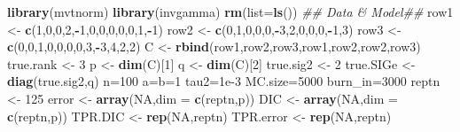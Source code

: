 \documentclass[]{book}
\newenvironment{Shaded}{\begin{snugshade}}{\end{snugshade}}
\newcommand{\CommentTok}[1]{\textcolor[rgb]{0.56,0.35,0.01}{\textit{#1}}}
\newcommand{\DataTypeTok}[1]{\textcolor[rgb]{0.13,0.29,0.53}{#1}}
\newcommand{\DecValTok}[1]{\textcolor[rgb]{0.00,0.00,0.81}{#1}}
\newcommand{\FloatTok}[1]{\textcolor[rgb]{0.00,0.00,0.81}{#1}}
\newcommand{\KeywordTok}[1]{\textcolor[rgb]{0.13,0.29,0.53}{\textbf{#1}}}
\newcommand{\NormalTok}[1]{#1}
\newcommand{\OperatorTok}[1]{\textcolor[rgb]{0.81,0.36,0.00}{\textbf{#1}}}
\newcommand{\OtherTok}[1]{\textcolor[rgb]{0.56,0.35,0.01}{#1}}
\newcommand{\StringTok}[1]{\textcolor[rgb]{0.31,0.60,0.02}{#1}}
\begin{document}
\begin{Shaded}
\begin{Highlighting}[]
\KeywordTok{library}\NormalTok{(mvtnorm)}
\KeywordTok{library}\NormalTok{(invgamma)}
\KeywordTok{rm}\NormalTok{(}\DataTypeTok{list=}\KeywordTok{ls}\NormalTok{())}
\CommentTok{## Data & Model##}
\NormalTok{row1 <-}\StringTok{ }\KeywordTok{c}\NormalTok{(}\DecValTok{1}\NormalTok{,}\DecValTok{0}\NormalTok{,}\DecValTok{0}\NormalTok{,}\DecValTok{2}\NormalTok{,}\OperatorTok{-}\DecValTok{1}\NormalTok{,}\DecValTok{0}\NormalTok{,}\DecValTok{0}\NormalTok{,}\DecValTok{0}\NormalTok{,}\DecValTok{0}\NormalTok{,}\DecValTok{0}\NormalTok{,}\DecValTok{1}\NormalTok{,}\OperatorTok{-}\DecValTok{1}\NormalTok{)}
\NormalTok{row2 <-}\StringTok{ }\KeywordTok{c}\NormalTok{(}\DecValTok{0}\NormalTok{,}\DecValTok{1}\NormalTok{,}\DecValTok{0}\NormalTok{,}\DecValTok{0}\NormalTok{,}\DecValTok{0}\NormalTok{,}\OperatorTok{-}\DecValTok{3}\NormalTok{,}\DecValTok{2}\NormalTok{,}\DecValTok{0}\NormalTok{,}\DecValTok{0}\NormalTok{,}\DecValTok{0}\NormalTok{,}\OperatorTok{-}\DecValTok{1}\NormalTok{,}\DecValTok{3}\NormalTok{)}
\NormalTok{row3 <-}\StringTok{ }\KeywordTok{c}\NormalTok{(}\DecValTok{0}\NormalTok{,}\DecValTok{0}\NormalTok{,}\DecValTok{1}\NormalTok{,}\DecValTok{0}\NormalTok{,}\DecValTok{0}\NormalTok{,}\DecValTok{0}\NormalTok{,}\DecValTok{0}\NormalTok{,}\DecValTok{3}\NormalTok{,}\OperatorTok{-}\DecValTok{3}\NormalTok{,}\DecValTok{4}\NormalTok{,}\DecValTok{2}\NormalTok{,}\DecValTok{2}\NormalTok{)}
\NormalTok{C <-}\StringTok{ }\KeywordTok{rbind}\NormalTok{(row1,row2,row3,row1,row2,row2,row3)}
\NormalTok{true.rank <-}\StringTok{ }\DecValTok{3}
\NormalTok{p <-}\StringTok{ }\KeywordTok{dim}\NormalTok{(C)[}\DecValTok{1}\NormalTok{]}
\NormalTok{q <-}\StringTok{ }\KeywordTok{dim}\NormalTok{(C)[}\DecValTok{2}\NormalTok{]}
\NormalTok{true.sig2 <-}\StringTok{ }\DecValTok{2}
\NormalTok{true.SIGe <-}\StringTok{ }\KeywordTok{diag}\NormalTok{(true.sig2,q)}
\NormalTok{n=}\DecValTok{100}
\NormalTok{a=b=}\DecValTok{1}
\NormalTok{tau2=}\FloatTok{1e-3}
\NormalTok{MC.size=}\DecValTok{5000}
\NormalTok{burn_in=}\DecValTok{3000}
\NormalTok{reptn <-}\StringTok{ }\DecValTok{125}
\NormalTok{error <-}\StringTok{ }\KeywordTok{array}\NormalTok{(}\OtherTok{NA}\NormalTok{,}\DataTypeTok{dim =} \KeywordTok{c}\NormalTok{(reptn,p))}
\NormalTok{DIC <-}\StringTok{ }\KeywordTok{array}\NormalTok{(}\OtherTok{NA}\NormalTok{,}\DataTypeTok{dim =} \KeywordTok{c}\NormalTok{(reptn,p))}
\NormalTok{TPR.DIC <-}\StringTok{ }\KeywordTok{rep}\NormalTok{(}\OtherTok{NA}\NormalTok{,reptn)}
\NormalTok{TPR.error <-}\StringTok{ }\KeywordTok{rep}\NormalTok{(}\OtherTok{NA}\NormalTok{,reptn)}

\end{Highlighting}
\end{Shaded}
\end{document}
